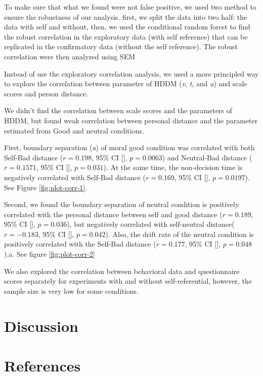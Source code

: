 \documentclass[
  english,
  man]{apa6}
\begin{document}
To make sure that what we found were not false positive, we used two method to ensure the robustness of our analysis. first, we split the data into two half: the data with self and without, then, we used the conditional random forest to find the robust correlation in the exploratory data (with self reference) that can be replicated in the confirmatory data (without the self reference). The robust correlation were then analyzed using SEM

Instead of use the exploratory correlation analysis, we used a more principled way to explore the correlation between parameter of HDDM (\emph{v}, \emph{t}, and \emph{a}) and scale scores and person distance.

We didn't find the correlation between scale scores and the parameters of HDDM, but found weak correlation between personal distance and the parameter estimated from Good and neutral conditions.

First, boundary separation (\emph{a}) of moral good condition was correlated with both Self-Bad distance (\(r = 0.198\), 95\% CI {[}{]}, \(p = 0.0063\)) and Neutral-Bad distance (\(r = 0.1571\), 95\% CI {[}{]}, \(p = 0.031\)). At the same time, the non-decision time is negatively correlated with Self-Bad distance (\(r = 0.169\), 95\% CI {[}{]}, \(p = 0.0197\)). See Figure \ref{fig:plot-corr-1}.

Second, we found the boundary separation of neutral condition is positively correlated with the personal distance between self and good distance (\(r = 0.189\), 95\% CI {[}{]}, \(p = 0.036\)), but negatively correlated with self-neutral distance(\(r = -0.183\), 95\% CI {[}{]}, \(p = 0.042\)). Also, the drift rate of the neutral condition is positively correlated with the Self-Bad distance (\(r = 0.177\), 95\% CI {[}{]}, \(p = 0.048\)).a. See figure \ref{fig:plot-corr-2}

We also explored the correlation between behavioral data and questionnaire scores separately for experiments with and without self-referential, however, the sample size is very low for some conditions.

\hypertarget{discussion}{%
\section{Discussion}\label{discussion}}

\hypertarget{references}{%
\section{References}\label{references}}
\end{document}
